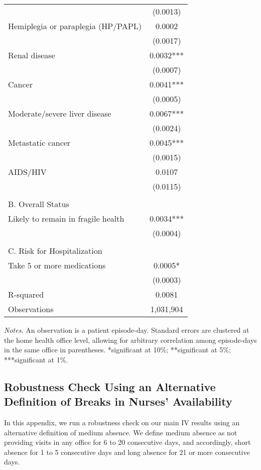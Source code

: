 \documentclass[final,12pt, notitlepage]{article}
\begin{document}
\begin{singlespace}
\begin{table}[H]
\begin{threeparttable}
{\begin{tabular}{lc}
 & (0.0013) \\
Hemiplegia or paraplegia (HP/PAPL) & 0.0002 \\
 & (0.0017) \\
Renal disease & 0.0032*** \\
 & (0.0007) \\
Cancer & 0.0041*** \\
 & (0.0005) \\
Moderate/severe liver disease & 0.0067*** \\
 & (0.0024) \\
Metastatic cancer & 0.0045*** \\
 & (0.0015) \\
AIDS/HIV & 0.0107 \\
 & (0.0115) \\
\\
\multicolumn{2}{l}{B. Overall Status}\\
Likely to remain in fragile health & 0.0034*** \\
 & (0.0004) \\
\\
\multicolumn{2}{l}{C. Risk for Hospitalization}\\
Take 5 or more medications & 0.0005* \\
 & (0.0003) \\
R-squared & 0.0081 \\
Observations & 1,031,904 \\
\bottomrule
\end{tabular}
}
	\begin{tablenotes}
	\scriptsize
	\item \emph{Notes.}
	An observation is a patient episode-day. Standard errors are clustered at the home health office level, allowing for arbitrary correlation among episode-days in the same office in parentheses.
	*significant at 10\%; **significant at 5\%; ***significant at 1\%.
	\end{tablenotes}
\end{threeparttable}
\end{table}


\clearpage
\subsection{Robustness Check Using an Alternative Definition of Breaks in Nurses' Availability} \label{appendix:lws_dist_alt}

In this appendix, we run a robustness check on our main IV results using an alternative definition of medium absence.
We define medium absence as not providing visits in any office for 6 to 20 consecutive days, and accordingly, short absence for 1 to 5 consecutive days and long absence for 21 or more consecutive days.


\end{singlespace}
\end{document}
